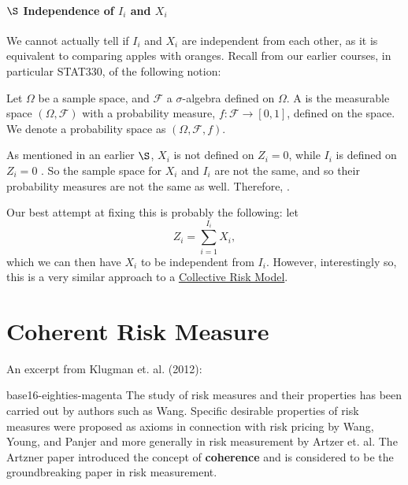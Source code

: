 \documentclass[notoc,notitlepage]{tufte-book}
\begin{document}
\paragraph{$\S$ Independence of $I_i$ and $X_i$} We cannot actually tell if $I_i$ and $X_i$ are independent from each other, as it is equivalent to comparing apples with oranges. Recall from our earlier courses, in particular STAT330, of the following notion:

\begin{defnnonum}
\label{defn:probability_space}
  Let $\Omega$ be a sample space, and $\mathcal{F}$ a $\sigma$-algebra defined on $\Omega$. A  is the measurable space $(\Omega, \mathcal{F})$ with a \textcolor{base16-eighties-blue}{probability measure}, $f: \mathcal{F} \to [0, 1]$, defined on the space. We denote a probability space as $(\Omega, \mathcal{F}, f)$.
\end{defnnonum}

As mentioned in an earlier $\S$, $X_i$ is not defined on $Z_i = 0$, while $I_i$ is defined on $Z_i = 0$ . So the sample space for $X_i$ and $I_i$ are not the same, and so their probability measures are not the same as well. Therefore, .

Our best attempt at fixing this is probably the following: let
\begin{equation*}
  Z_i = \sum_{i=1}^{I_i} X_i,
\end{equation*}
which we can then have $X_i$ to be independent from $I_i$. However, interestingly so, this is a very similar approach to a \hyperref[defn:collective_risk_model]{Collective Risk Model}.


\section{Coherent Risk Measure}%
\label{sec:coherent_risk_measure}

An excerpt from Klugman et. al. (2012)\cite{KlugmanPanjerWillmot2012}:

\begin{quotebox}{base16-eighties-magenta}
  The study of risk measures and their properties has been carried out by authors such as Wang. Specific desirable properties of risk measures were proposed as axioms in connection with risk pricing by Wang, Young, and Panjer and more generally in risk measurement by Artzer et. al. The Artzner paper introduced the concept of \textbf{coherence} and is considered to be the groundbreaking paper in risk measurement.
\end{quotebox}
\end{document}
